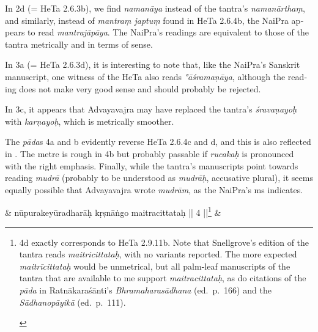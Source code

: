 \documentclass[naipra.tex]{subfiles}
\begin{document}
\begin{sanskrit}
{\begin{english}
		In 2d (= HeTa 2.6.3b), we find \emph{namanāya} instead of the tantra's \emph{namanārthaṃ}, and similarly, instead of \emph{mantraṃ japtuṃ} found in HeTa 2.6.4b, the NaiPra appears to read \emph{mantrajāpāya}.
		The NaiPra's readings are equivalent to those of the tantra metrically and in terms of sense.

		In 3a (= HeTa 2.6.3d), it is interesting to note that, like the NaiPra's Sanskrit manuscript, one witness of the HeTa also reads \emph{°āśramaṇāya}, although the reading does not make very good sense and should probably be rejected.

		In 3c, it appears that Advayavajra may have replaced the tantra's \emph{śravaṇayoḥ} with \emph{karṇayoḥ}, which is metrically smoother.

		The \emph{pāda}s 4a and b evidently reverse HeTa 2.6.4c and d, and this is also reflected in \TIB.
		The metre is rough in 4b but probably passable if \emph{rucakaḥ} is pronounced with the right emphasis.
		Finally, while the tantra's manuscripts point towards reading \emph{mudrā} (probably to be understood as \emph{mudrāḥ}, accusative plural), it seems equally possible that Advayavajra wrote \emph{mudrām}, as the NaiPra's ms indicates.
	\end{english}
} &
nūpurakeyūradharāḥ kṛṣnāṅgo maitracittataḥ || 4 ||\footnote{
	\begin{english}%
		4d exactly corresponds to HeTa 2.9.11b.
		Note that Snellgrove's edition of the tantra reads \emph{maitricittataḥ}, with no variants reported.
		The more expected \emph{maitrīcittataḥ} would be unmetrical, but all palm-leaf manuscripts of the tantra that are available to me support \emph{maitracittataḥ}, as do citations of the \emph{pāda} in Ratnākaraśānti's \emph{Bhramaharasādhana} (ed.\ p.\ 166) and the \emph{Sādhanopāyikā} (ed.\ p.\ 111). 
	\end{english}
} \&



\end{sanskrit}
\end{document}
